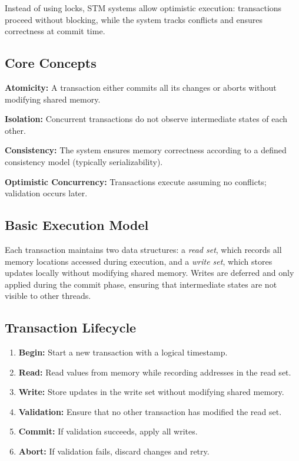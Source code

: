 \documentclass[11pt,a4paper]{article}
\begin{document}
Instead of using locks, STM systems allow optimistic execution: transactions proceed without blocking, while the system tracks conflicts and ensures correctness at commit time.

\subsection{Core Concepts}

\textbf{Atomicity:} A transaction either commits all its changes or aborts without modifying shared memory.

\textbf{Isolation:} Concurrent transactions do not observe intermediate states of each other.

\textbf{Consistency:} The system ensures memory correctness according to a defined consistency model (typically serializability).

\textbf{Optimistic Concurrency:} Transactions execute assuming no conflicts; validation occurs later.

\subsection{Basic Execution Model}

Each transaction maintains two data structures: a \textit{read set}, which records all memory locations accessed during execution, and a \textit{write set}, which stores updates locally without modifying shared memory. Writes are deferred and only applied during the commit phase, ensuring that intermediate states are not visible to other threads.
\subsection{Transaction Lifecycle}

\begin{enumerate}
    \item \textbf{Begin:} Start a new transaction with a logical timestamp.
    \item \textbf{Read:} Read values from memory while recording addresses in the read set.
    \item \textbf{Write:} Store updates in the write set without modifying shared memory.
    \item \textbf{Validation:} Ensure that no other transaction has modified the read set.
    \item \textbf{Commit:} If validation succeeds, apply all writes.
    \item \textbf{Abort:} If validation fails, discard changes and retry.
\end{enumerate}
\end{document}
